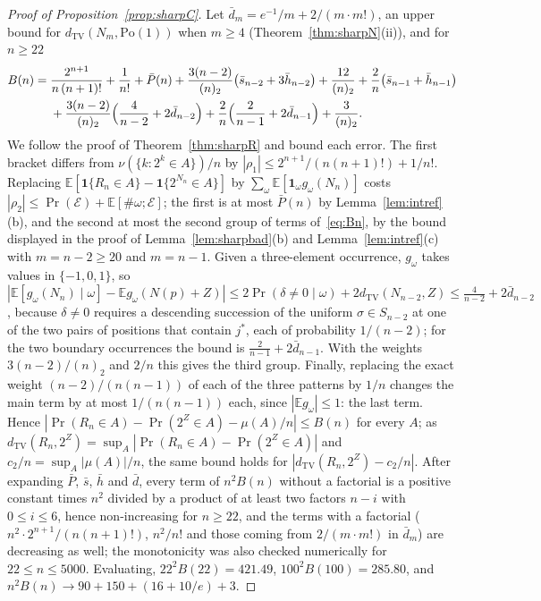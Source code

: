 \begin{proof}[Proof of Proposition~\ref{prop:sharpC}]
Let $\bar d_m=e^{-1}/m+2/(m\cdot m!)$, an upper bound for $d_{\mathrm{TV}}(N_m,\mathrm{Po}(1))$ when $m\ge4$ (Theorem~\ref{thm:sharpN}(ii)), and for $n\ge22$
\begin{equation}\label{eq:Bn}
\begin{aligned}
B(n)={}&\frac{2^{n+1}}{n\,(n+1)!}+\frac1{n!}+\bar P(n)
+\frac{3(n-2)}{(n)_2}\bigl(\bar s_{n-2}+3\bar h_{n-2}\bigr)+\frac{12}{(n)_2}+\frac2n\bigl(\bar s_{n-1}+\bar h_{n-1}\bigr)\\
&+\frac{3(n-2)}{(n)_2}\Bigl(\frac4{n-2}+2\bar d_{n-2}\Bigr)+\frac2n\Bigl(\frac2{n-1}+2\bar d_{n-1}\Bigr)+\frac3{(n)_2}.
\end{aligned}
\end{equation}
We follow the proof of Theorem~\ref{thm:sharpR} and bound each error. The first bracket differs from $\nu(\{k:2^k\in A\})/n$ by $|\rho_1|\le2^{n+1}/(n(n+1)!)+1/n!$. Replacing $\mathbb E[\mathbf 1\{R_n\in A\}-\mathbf 1\{2^{N_n}\in A\}]$ by $\sum_\omega\mathbb E[\mathbf 1_\omega g_\omega(N_n)]$ costs $|\rho_2|\le\Pr(\mathcal E)+\mathbb E[\#\omega;\mathcal E]$; the first is at most $\bar P(n)$ by Lemma~\ref{lem:intref}(b), and the second at most the second group of terms of~\eqref{eq:Bn}, by the bound displayed in the proof of Lemma~\ref{lem:sharpbad}(b) and Lemma~\ref{lem:intref}(c) with $m=n-2\ge20$ and $m=n-1$. Given a three-element occurrence, $g_\omega$ takes values in $\{-1,0,1\}$, so $|\mathbb E[g_\omega(N_n)\mid\omega]-\mathbb Eg_\omega(N(p)+Z)|\le2\Pr(\delta\ne0\mid\omega)+2d_{\mathrm{TV}}(N_{n-2},Z)\le\frac4{n-2}+2\bar d_{n-2}$, because $\delta\ne0$ requires a descending succession of the uniform $\sigma\in S_{n-2}$ at one of the two pairs of positions that contain $j^*$, each of probability $1/(n-2)$; for the two boundary occurrences the bound is $\frac2{n-1}+2\bar d_{n-1}$. With the weights $3(n-2)/(n)_2$ and $2/n$ this gives the third group. Finally, replacing the exact weight $(n-2)/(n(n-1))$ of each of the three patterns by $1/n$ changes the main term by at most $1/(n(n-1))$ each, since $|\mathbb Eg_\omega|\le1$: the last term. Hence $|\Pr(R_n\in A)-\Pr(2^Z\in A)-\mu(A)/n|\le B(n)$ for every $A$; as $d_{\mathrm{TV}}(R_n,2^Z)=\sup_A|\Pr(R_n\in A)-\Pr(2^Z\in A)|$ and $c_2/n=\sup_A|\mu(A)|/n$, the same bound holds for $|d_{\mathrm{TV}}(R_n,2^Z)-c_2/n|$. After expanding $\bar P$, $\bar s$, $\bar h$ and $\bar d$, every term of $n^2B(n)$ without a factorial is a positive constant times $n^2$ divided by a product of at least two factors $n-i$ with $0\le i\le6$, hence non-increasing for $n\ge22$, and the terms with a factorial ($n^2\cdot2^{n+1}/(n(n+1)!)$, $n^2/n!$ and those coming from $2/(m\cdot m!)$ in $\bar d_m$) are decreasing as well; the monotonicity was also checked numerically for $22\le n\le5000$. Evaluating, $22^2B(22)=421.49$, $100^2B(100)=285.80$, and $n^2B(n)\to90+150+(16+10/e)+3$.
\end{proof}

